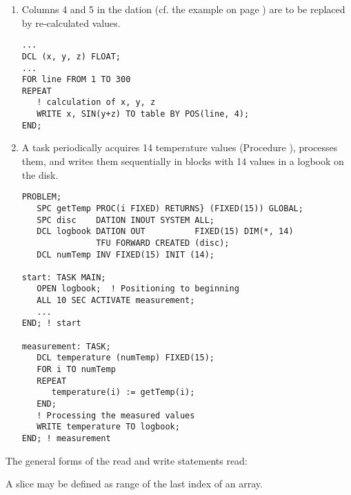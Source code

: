 \begin{enumerate}
\item Columns 4 and 5 in the dation   (cf. the example on page
\pageref{example}) are to be replaced by re-calculated values.

\begin{lstlisting}
...
DCL (x, y, z) FLOAT;
...
FOR line FROM 1 TO 300
REPEAT
   ! calculation of x, y, z
   WRITE x, SIN(y+z) TO table BY POS(line, 4);
END;
\end{lstlisting}

\item A task  periodically acquires 14 temperature values
(Procedure ), processes them, and writes them sequentially in
blocks with 14 values in a logbook on the disk.

\begin{lstlisting}
PROBLEM;
   SPC getTemp PROC(i FIXED) RETURNS} (FIXED(15)) GLOBAL;
   SPC disc    DATION INOUT SYSTEM ALL;
   DCL logbook DATION OUT          FIXED(15) DIM(*, 14)
               TFU FORWARD CREATED (disc);
   DCL numTemp INV FIXED(15) INIT (14);

start: TASK MAIN;
   OPEN logbook;  ! Positioning to beginning
   ALL 10 SEC ACTIVATE measurement;
   ... 
END; ! start

measurement: TASK;
   DCL temperature (numTemp) FIXED(15); 
   FOR i TO numTemp
   REPEAT
      temperature(i) := getTemp(i);
   END;
   ! Processing the measured values
   WRITE temperature TO logbook; 
END; ! measurement
\end{lstlisting}
\end{enumerate}

The general forms of the read and write statements read:

\begin{grammarframe}


\end{grammarframe}

A slice may be defined as range of the last index of an array.
\begin{grammarframe}








\end{grammarframe}


